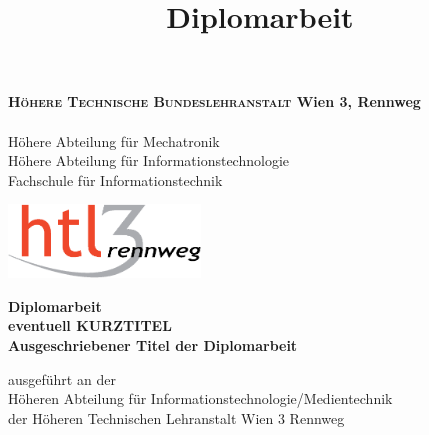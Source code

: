 \documentclass[
    headings=optiontotocandhead,%
    twoside,
    numbers=noenddot,%
    toc=flat, %
    12pt, %
    titlepage, %
    parskip=full, %
    listof=totoc, %
    listof=flat, %
    numbers=noenddot, %
    bibliography=totoc, %
    a4paper,DIV=14,
    BCOR=15mm,
]{scrbook}
\begin{document}
\newcommand{\kapitelautor}{}




\frontmatter %
\title{Diplomarbeit}

\begin{titlepage}
\begin{minipage}[b]{1\columnwidth}
\parbox[b]{99mm}{
\begin{TitlePageBox}
\footnotesize%
\textsf{%
\textbf{\textsc{Höhere Technische Bundeslehranstalt} Wien 3, Rennweg}\\
\\
Höhere Abteilung für Mechatronik\\
Höhere Abteilung für Informationstechnologie\\
Fachschule für Informationstechnik}
\end{TitlePageBox}
}\hfill\parbox[b]{50mm}{\includegraphics[width=51mm]{HTL3RLogoRGB}}
\mbox{}
\end{minipage}

\vspace{1cm}


\begin{center}

\textbf{\LARGE{}Diplomarbeit}{\large{}}\\ %
{\large{}\vspace{15mm}
 }\textbf{\large{}eventuell KURZTITEL}\\
\textbf{\large{}Ausgeschriebener Titel der Diplomarbeit}\\

 \vfill

 ausgeführt an der\\
 Höheren Abteilung für Informationstechnologie/Medientechnik\\
 der Höheren Technischen Lehranstalt Wien 3 Rennweg\\


\end{center}
\end{titlepage}
\end{document}
